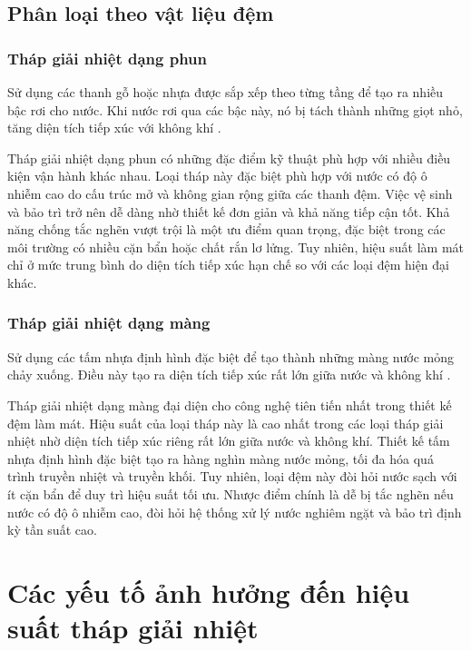\documentclass[../main.tex]{subfiles}
\begin{document}
\subsection{Phân loại theo vật liệu đệm}
\label{sec:classification_by_fill_material}

\subsubsection{Tháp giải nhiệt dạng phun}
Sử dụng các thanh gỗ hoặc nhựa được sắp xếp theo từng tầng để tạo ra nhiều bậc rơi cho nước. Khi nước rơi qua các bậc này, nó bị tách thành những giọt nhỏ, tăng diện tích tiếp xúc với không khí \cite{marriott_practical_thermal_2009}.

Tháp giải nhiệt dạng phun có những đặc điểm kỹ thuật phù hợp với nhiều điều kiện vận hành khác nhau. Loại tháp này đặc biệt phù hợp với nước có độ ô nhiễm cao do cấu trúc mở và không gian rộng giữa các thanh đệm. Việc vệ sinh và bảo trì trở nên dễ dàng nhờ thiết kế đơn giản và khả năng tiếp cận tốt. Khả năng chống tắc nghẽn vượt trội là một ưu điểm quan trọng, đặc biệt trong các môi trường có nhiều cặn bẩn hoặc chất rắn lơ lửng. Tuy nhiên, hiệu suất làm mát chỉ ở mức trung bình do diện tích tiếp xúc hạn chế so với các loại đệm hiện đại khác.

\subsubsection{Tháp giải nhiệt dạng màng}
Sử dụng các tấm nhựa định hình đặc biệt để tạo thành những màng nước mỏng chảy xuống. Điều này tạo ra diện tích tiếp xúc rất lớn giữa nước và không khí \cite{marriott_practical_thermal_2009}.

Tháp giải nhiệt dạng màng đại diện cho công nghệ tiên tiến nhất trong thiết kế đệm làm mát. Hiệu suất của loại tháp này là cao nhất trong các loại tháp giải nhiệt nhờ diện tích tiếp xúc riêng rất lớn giữa nước và không khí. Thiết kế tấm nhựa định hình đặc biệt tạo ra hàng nghìn màng nước mỏng, tối đa hóa quá trình truyền nhiệt và truyền khối. Tuy nhiên, loại đệm này đòi hỏi nước sạch với ít cặn bẩn để duy trì hiệu suất tối ưu. Nhược điểm chính là dễ bị tắc nghẽn nếu nước có độ ô nhiễm cao, đòi hỏi hệ thống xử lý nước nghiêm ngặt và bảo trì định kỳ tần suất cao.

\section{Các yếu tố ảnh hưởng đến hiệu suất tháp giải nhiệt}
\label{sec:factors_affecting_performance}
\end{document}
